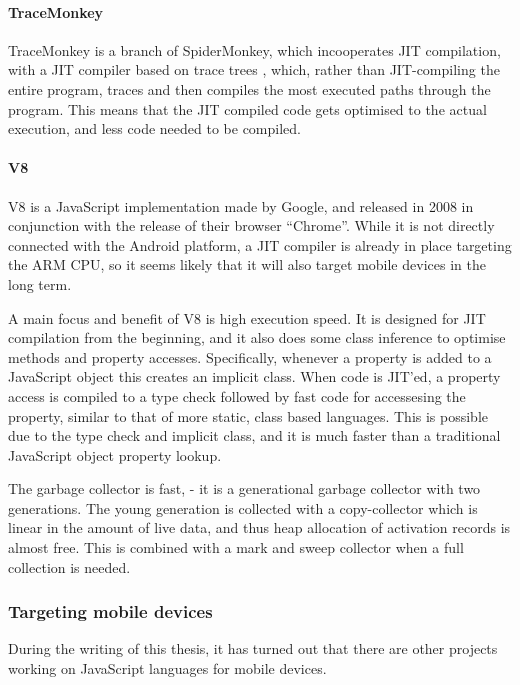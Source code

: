 \documentclass[11pt]{report}
\begin{document}
\paragraph{TraceMonkey} 
TraceMonkey \cite{tracemonkey} is a branch of SpiderMonkey, which incooperates JIT compilation, with a JIT compiler based on trace trees \cite{trace-tree, trace-tree2}, 
which, rather than JIT-compiling the entire program,
traces and then compiles the most executed paths through the program.
This means that the JIT compiled code gets optimised to the actual execution,
and less code needed to be compiled.

\paragraph{V8} V8 \cite{v8} is a JavaScript implementation made by Google, and released in 2008 in conjunction with the release of their browser ``Chrome''. 
While it is not directly connected with the Android platform, a JIT compiler is already in place targeting the ARM CPU, so it seems likely that it will also target mobile devices in the long term.

A main focus and benefit of V8 is high execution speed.
It is designed for JIT compilation from the beginning, and it also does some class inference to optimise methods and property accesses.
Specifically, whenever a property is added to a JavaScript object this creates an implicit class. When code is JIT'ed, a property access is compiled to a type check followed by fast code for accessesing the property, similar to that of more static, class based languages. This is possible due to the type check and implicit class, and it is much faster than a traditional JavaScript object property lookup.

The garbage collector is fast, - it is a generational garbage collector with two generations. The young generation is collected with a copy-collector which is linear in the amount of live data, and thus heap allocation of activation records is almost free. 
This is combined with a mark and sweep collector when a full collection is needed.

\subsubsection{Targeting mobile devices}

During the writing of this thesis, it has turned out that there are other projects working on JavaScript languages for mobile devices.
\end{document}
